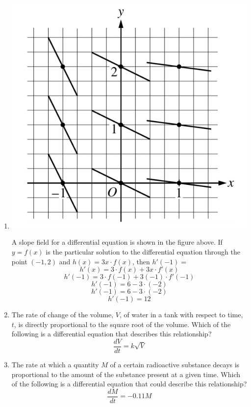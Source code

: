 \documentclass[12pt]{article}
\begin{document}
\begin{enumerate}
\item 
\begin{center}
    \includegraphics[scale=0.5]{original-4.png}
\end{center}

A slope field for a differential equation is shown in the figure above. If $y = f(x)$ is the particular solution to the differential equation through the point $(-1,2)$ and $h(x) = 3x\cdot f(x)$, then $h'(-1) =$
$$h'(x)=3\cdot f(x) + 3x\cdot f'(x)$$
$$h'(-1)=3\cdot f(-1) + 3(-1)\cdot f'(-1)$$
$$h'(-1)=6 -3\cdot (-2)$$
$$h'(-1)=6 -3\cdot (-2)$$
$$\boxed{h'(-1)=12}$$

\item The rate of change of the volume, $V$, of water in a tank with respect to time, $t$, is directly proportional to the square root of the volume. Which of the following is a differential equation that describes this relationship?
$$\boxed{\frac{dV}{dt}=k \sqrt{V}}$$

\item The rate at which a quantity $M$ of a certain radioactive substance decays is proportional to the amount of the substance present at a given time. Which of the following is a differential equation that could describe this relationship?
$$\boxed{\frac{dM}{dt}=-0.11M}$$
\end{enumerate}
\end{document}
